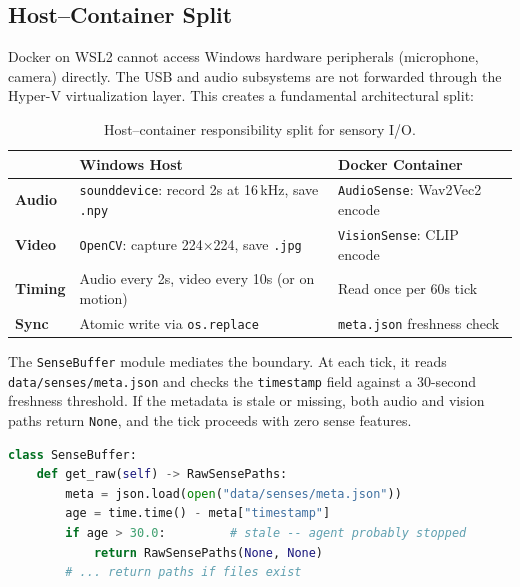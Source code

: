\subsection{Host--Container Split}
\label{sec:host_container}

Docker on WSL2 cannot access Windows hardware peripherals (microphone, camera) directly.
The USB and audio subsystems are not forwarded through the Hyper-V virtualization layer.
This creates a fundamental architectural split:

\begin{table}[h]
\centering
\caption{Host--container responsibility split for sensory I/O.}
\label{tab:host_container}
\small
\begin{tabularx}{\columnwidth}{lXX}
\toprule
 & \textbf{Windows Host} & \textbf{Docker Container} \\
\midrule
\textbf{Audio} & \texttt{sounddevice}: record 2s at 16\,kHz, save \texttt{.npy} & \texttt{AudioSense}: Wav2Vec2 encode \\
\textbf{Video} & \texttt{OpenCV}: capture 224$\times$224, save \texttt{.jpg} & \texttt{VisionSense}: CLIP encode \\
\textbf{Timing} & Audio every 2s, video every 10s (or on motion) & Read once per 60s tick \\
\textbf{Sync} & Atomic write via \texttt{os.replace} & \texttt{meta.json} freshness check \\
\bottomrule
\end{tabularx}
\end{table}

The \texttt{SenseBuffer} module mediates the boundary.
At each tick, it reads \texttt{data/senses/meta.json} and checks the \texttt{timestamp} field against a 30-second freshness threshold.
If the metadata is stale or missing, both audio and vision paths return \texttt{None}, and the tick proceeds with zero sense features.

\begin{lstlisting}[language=python,caption={SenseBuffer freshness check (simplified).},label=lst:sensebuf]
class SenseBuffer:
    def get_raw(self) -> RawSensePaths:
        meta = json.load(open("data/senses/meta.json"))
        age = time.time() - meta["timestamp"]
        if age > 30.0:         # stale -- agent probably stopped
            return RawSensePaths(None, None)
        # ... return paths if files exist
\end{lstlisting}

